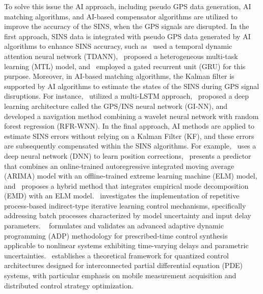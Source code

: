 \documentclass[3p]{elsarticle}
\begin{document}
To solve this issue the AI approach, including pseudo GPS data generation, AI matching algorithms, and AI-based compensator algorithms are utilized to improve the accuracy of the SINS, when the GPS signals are disrupted. In the first approach, SINS data is integrated with pseudo GPS data generated by AI algorithms to enhance SINS accuracy, such as~\cite{10298043} used a temporal dynamic attention neural network (TDANN),~\cite{9212618} proposed a heterogeneous multi-task learning (MTL) model, and~\cite{10215333} employed a gated recurrent unit (GRU) for this purpose.
Moreover, in AI-based matching algorithms, the Kalman filter is supported by AI algorithms to estimate the states of the SINS during GPS signal disruptions. For instance,~\cite{9486855} utilized a multi-LSTM approach,~\cite{9722837} proposed a deep learning architecture called the GPS/INS neural network (GI-NN), and~\cite{9386104} developed a navigation method combining a wavelet neural network with random forest regression (RFR-WNN).
In the final approach, AI methods are applied to estimate SINS errors without relying on a Kalman Filter (KF), and these errors are subsequently compensated within the SINS algorithms. For example,~\cite{Kanherenavi.548} uses a deep neural network (DNN) to learn position corrections,~\cite{8314549} presents a predictor that combines an online-trained autoregressive integrated moving average (ARIMA) model with an offline-trained extreme learning machine (ELM) model, and~\cite{9036942} proposes a hybrid method that integrates empirical mode decomposition (EMD) with an ELM model.~\cite{TAO2023103112} investigates the implementation of repetitive process-based indirect-type iterative learning control mechanisms, specifically addressing batch processes characterized by model uncertainty and input delay parameters.
~\cite{10505167} formulates and validates an advanced adaptive dynamic programming (ADP) methodology for prescribed-time control synthesis applicable to nonlinear systems exhibiting time-varying delays and parametric uncertainties.~\cite{article_xxx} establishes a theoretical framework for quantized control architectures designed for interconnected partial differential equation (PDE) systems, with particular emphasis on mobile measurement acquisition and distributed control strategy optimization.
\end{document}
